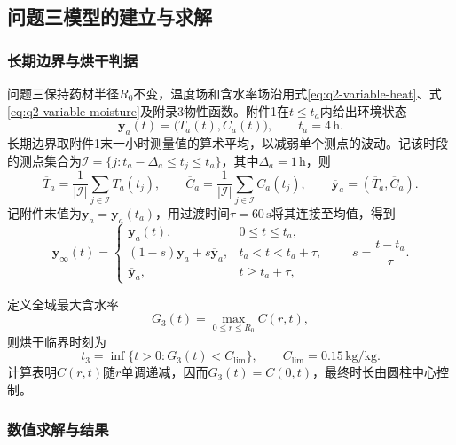 \subsection{问题三模型的建立与求解}

\subsubsection{长期边界与烘干判据}

问题三保持药材半径$R_0$不变，温度场和含水率场沿用式\eqref{eq:q2-variable-heat}、式\eqref{eq:q2-variable-moisture}及附录3物性函数。附件1在$t\le t_a$内给出环境状态
\[
\boldsymbol y_a(t)=\bigl(T_a(t),C_a(t)\bigr),
\qquad t_a=4\,\mathrm h.
\]
长期边界取附件1末一小时测量值的算术平均，以减弱单个测点的波动。记该时段的测点集合为$\mathcal I=\{j:t_a-\Delta_a\le t_j\le t_a\}$，其中$\Delta_a=1\,\mathrm h$，则
\begin{equation}
\overline T_a=\frac{1}{|\mathcal I|}\sum_{j\in\mathcal I}T_a(t_j),
\qquad
\overline C_a=\frac{1}{|\mathcal I|}\sum_{j\in\mathcal I}C_a(t_j),
\qquad
\overline{\boldsymbol y}_a=(\overline T_a,\overline C_a).
\label{eq:q3r-environment-mean}
\end{equation}
记附件末值为$\boldsymbol y_a=\boldsymbol y_a(t_a)$，用过渡时间$\tau=60\,\mathrm s$将其连接至均值，得到
\begin{equation}
\boldsymbol y_\infty(t)=
\begin{cases}
\boldsymbol y_a(t),&0\le t\le t_a,\\
(1-s)\boldsymbol y_a+s\overline{\boldsymbol y}_a,
&t_a<t<t_a+\tau,\\
\overline{\boldsymbol y}_a,&t\ge t_a+\tau,
\end{cases}
\qquad s=\dfrac{t-t_a}{\tau}.
\label{eq:q3r-environment}
\end{equation}

定义全域最大含水率
\begin{equation}
G_3(t)=\max_{0\le r\le R_0}C(r,t),
\label{eq:q3r-maximum}
\end{equation}
则烘干临界时刻为
\begin{equation}
\boxed{
t_3=\inf\{t>0:G_3(t)<C_{\mathrm{lim}}\},
\qquad C_{\mathrm{lim}}=0.15\,\mathrm{kg/kg}.
}
\label{eq:q3r-event}
\end{equation}
计算表明$C(r,t)$随$r$单调递减，因而$G_3(t)=C(0,t)$，最终时长由圆柱中心控制。

\subsubsection{数值求解与结果}

